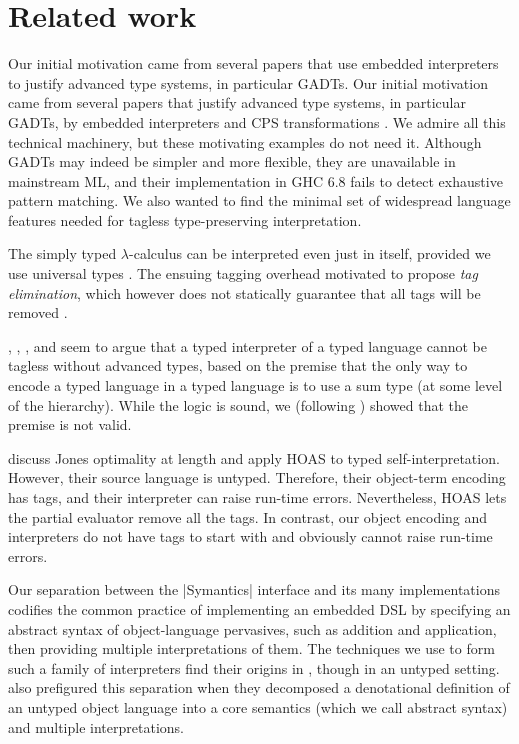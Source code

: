 \section{Related work}\label{related}

\ifshort
Our initial motivation came from several papers 
\citep{WalidICFP02,taha-tag,xi-guarded,peyton-jones-simple}
that use embedded interpreters to justify advanced
type systems, in particular GADTs.
\else
Our initial motivation came from several papers that justify advanced
type systems, in particular GADTs, by embedded interpreters
\citep{WalidICFP02,taha-tag,xi-guarded,peyton-jones-simple} and
CPS transformations \citep{Guillemette-Monier-PLPV,shao-type-toplas,chen-typeful}.
\fi
We admire all this technical machinery, but
these motivating examples do not need it.
Although GADTs may indeed be simpler and more flexible, they are
unavailable in mainstream ML, and their implementation in GHC
6.8 fails to
detect exhaustive pattern matching.  We also wanted to find the minimal
set of widespread language features needed for tagless
type-preserving interpretation.

The simply typed $\lambda$-calculus can be interpreted even just in
itself, provided we use universal types \citep{taha-tag}.  The
ensuing tagging overhead motivated \citet{Makholm-TagElim,taha-tag} 
to propose \emph{tag
elimination}, which however does not statically guarantee that all tags
will be removed \citep{WalidICFP02}.

, \citet{taha-tag}, \citet{xi-guarded}, and
\citet{peyton-jones-simple} seem to argue that a typed
interpreter of a typed language cannot be tagless without
advanced types, based on the premise that the only way to
encode a typed language in a typed language is to use
a sum type (at some level of the hierarchy).
While the logic is sound, we (following \citet{yang-encoding}) showed that the
premise is not valid.

\citet{Danvy-tagging-encoding} discuss Jones optimality at length and
apply HOAS to typed self\hyp interpretation.  However, their source
language is untyped.  Therefore, their object\hyp term encoding has
tags, and their interpreter can raise run-time errors.
Nevertheless, HOAS lets the partial
evaluator remove all the tags. In contrast, our object encoding and
interpreters do not have tags to start with and obviously cannot
raise run-time errors.

Our separation between the |Symantics| interface and its many
implementations codifies the common practice of implementing an embedded
DSL by specifying an abstract syntax of object\hyp language pervasives,
such as addition and application, then providing multiple
interpretations of them.
The techniques we use to form such a family of interpreters
find their origins in \citet{Holst-AMIX}, though in an untyped setting.
 also
prefigured this separation when they decomposed a denotational definition of an
untyped object language into a core semantics (which we call abstract syntax)
and multiple interpretations.

